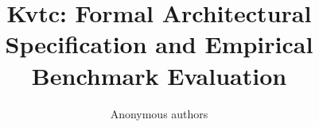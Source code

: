 \title{\textbf{Kvtc: Formal Architectural Specification and Empirical Benchmark Evaluation}}

\author{Anonymous authors}
